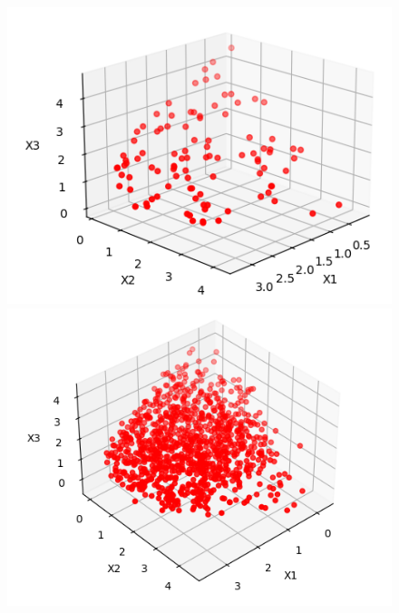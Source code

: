 \documentclass[11pt]{article}
\begin{document}
\begin{figure}[H]
    \centering
    \begin{minipage}{0.3\textwidth}
        \centering
        \includegraphics[width=\textwidth]{image/vis_collected.png}
    \end{minipage}
    \hfill
    \begin{minipage}{0.3\textwidth}
        \centering
        \includegraphics[width=\textwidth]{image/dif_col_generated_1.png}
    \end{minipage}
    \hfill
    \begin{minipage}{0.3\textwidth}
        \centering

\end{minipage}
\end{figure}
\end{document}
